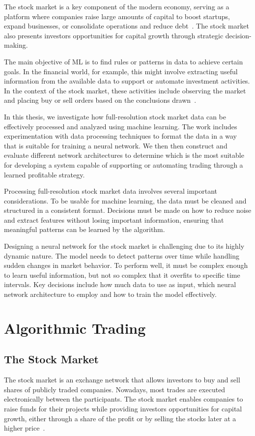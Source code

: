 \documentclass[a4paper,oneside,onecolumn,12pt]{book}
\begin{document}
The stock market is a key component of the modern economy, serving as a platform where companies raise large amounts of capital to boost startups, expand businesses, or consolidate operations and reduce debt~\cite{WSMandHDIW}. The stock market also presents investors opportunities for capital growth through strategic decision-making. 

The main objective of ML is to find rules or patterns in data to achieve certain goals. In the financial world, for example, this might involve extracting useful information from the available data to support or automate investment activities. In the context of the stock market, these activities include observing the market and placing buy or sell orders based on the conclusions drawn~\cite{MLAT}.

In this thesis, we investigate how full-resolution stock market data can be effectively processed and analyzed using machine learning. The work includes experimentation with data processing techniques to format the data in a way that is suitable for training a neural network. We then then construct and evaluate different network architectures to determine which is the most suitable for developing a system capable of supporting or automating trading through a learned profitable strategy.

Processing full-resolution stock market data involves several important considerations. To be usable for machine learning, the data must be cleaned and structured in a consistent format. Decisions must be made on how to reduce noise and extract features without losing important information, ensuring that meaningful patterns can be learned by the algorithm.

Designing a neural network for the stock market is challenging due to its highly dynamic nature. The model needs to detect patterns over time while handling sudden changes in market behavior. To perform well, it must be complex enough to learn useful information, but not so complex that it overfits to specific time intervals. Key decisions include how much data to use as input, which neural network architecture to employ and how to train the model effectively.

\chapter{Algorithmic Trading}
\section{The Stock Market}
The stock market is an exchange network that allows investors to buy and sell shares of publicly traded companies. Nowadays, most trades are executed electronically between the participants. The stock market enables companies to raise funds for their projects while providing investors opportunities for capital growth, either through a share of the profit or by selling the stocks later at a higher price~\cite{WSMandHDIW}.
\end{document}
